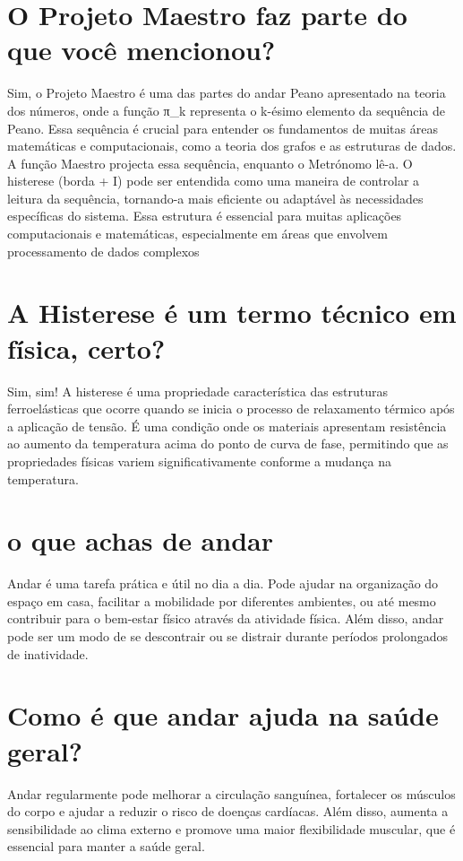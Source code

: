 \documentclass[11pt,a4paper]{article}
\begin{document}
\section{O Projeto Maestro faz parte do que você mencionou?}
Sim, o Projeto Maestro é uma das partes do andar Peano apresentado na teoria dos números, onde a função π\_k representa o k-ésimo elemento da sequência de Peano. Essa sequência é crucial para entender os fundamentos de muitas áreas matemáticas e computacionais, como a teoria dos grafos e as estruturas de dados. A função Maestro projecta essa sequência, enquanto o Metrónomo lê-a. O histerese (borda + I) pode ser entendida como uma maneira de controlar a leitura da sequência, tornando-a mais eficiente ou adaptável às necessidades específicas do sistema. Essa estrutura é essencial para muitas aplicações computacionais e matemáticas, especialmente em áreas que envolvem processamento de dados complexos

\section{A Histerese é um termo técnico em física, certo?}
Sim, sim! A histerese é uma propriedade característica das estruturas ferroelásticas que ocorre quando se inicia o processo de relaxamento térmico após a aplicação de tensão. É uma condição onde os materiais apresentam resistência ao aumento da temperatura acima do ponto de curva de fase, permitindo que as propriedades físicas variem significativamente conforme a mudança na temperatura.

\section{o que achas de andar}
Andar é uma tarefa prática e útil no dia a dia. Pode ajudar na organização do espaço em casa, facilitar a mobilidade por diferentes ambientes, ou até mesmo contribuir para o bem-estar físico através da atividade física. Além disso, andar pode ser um modo de se descontrair ou se distrair durante períodos prolongados de inatividade.

\section{Como é que andar ajuda na saúde geral?}
Andar regularmente pode melhorar a circulação sanguínea, fortalecer os músculos do corpo e ajudar a reduzir o risco de doenças cardíacas. Além disso, aumenta a sensibilidade ao clima externo e promove uma maior flexibilidade muscular, que é essencial para manter a saúde geral.
\end{document}
